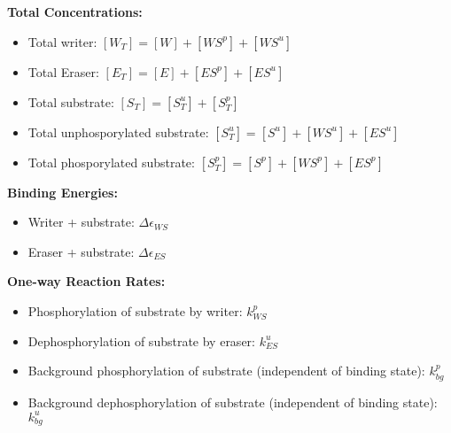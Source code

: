\documentclass[aps,onecolumn,superscriptaddress,notitlepage]{revtex4-1}
\begin{document}
\textbf{Total Concentrations:}
\begin{itemize}
\item Total writer: $[W_T] = [W] + [WS^p] + [WS^u]$
\item Total Eraser: $[E_T] = [E]  + [ES^p] + [ES^u]$
\item Total substrate: $[S_T] = [S^u_T] + [S^p_T]$
\item Total unphosporylated substrate: $[S^u_T] = [S^u] + [WS^u] + [ES^u]$
\item Total phosporylated substrate: $[S^p_T] = [S^p] + [WS^p] + [ES^p]$
\end{itemize}


\textbf{Binding Energies:}
\begin{itemize}
\item Writer + substrate: $\Delta\epsilon_{WS}$
\item Eraser + substrate: $\Delta\epsilon_{ES}$
\end{itemize}

\textbf{One-way Reaction Rates:}
\begin{itemize}
\item Phosphorylation of substrate by writer: $k_{WS}^p$
\item Dephosphorylation of substrate by eraser: $k_{ES}^u$
\item Background phosphorylation of substrate (independent of binding state): $k_{bg}^p$
\item Background dephosphorylation of substrate (independent of binding state): $k_{bg}^u$
\end{itemize}
\end{document}
